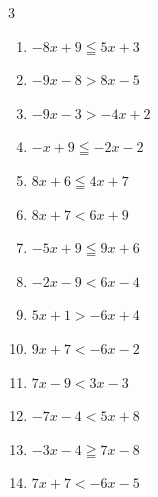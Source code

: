 \begin{multicols}{3}
\begin{enumerate}
\columnbreak %

  \item $-8x+9\leqq 5x+3$


  \item $-9x-8>8x-5$


  \item $-9x-3>-4x+2$

        \phantom{$\displaystyle x<-1$}

  \item $-x+9\leqq -2x-2$

        \phantom{$\displaystyle x\leqq -11$}

  \item $8x+6\leqq 4x+7$


  \item $8x+7<6x+9$

        \phantom{$\displaystyle x<1$}

  \item $-5x+9\leqq 9x+6$


  \item $-2x-9<6x-4$


  \item $5x+1>-6x+4$


  \item $9x+7<-6x-2$


  \item $7x-9<3x-3$


  \item $-7x-4<5x+8$

        \phantom{$\displaystyle x>-1$}

  \item $-3x-4\geqq 7x-8$


  \item $7x+7<-6x-5$


\end{enumerate}
\end{multicols}
